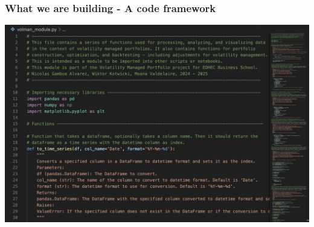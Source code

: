 \documentclass[9pt]{beamer}  %
\begin{document}
\begin{frame}
    \frametitle{What we are building - A code framework}  %
    \begin{center}
        \includegraphics[width=\textwidth, height=0.8\textheight, keepaspectratio]{Screenshot 2024-11-29 at 19.50.18.png}  %
    \end{center}
\end{frame}
\end{document}
